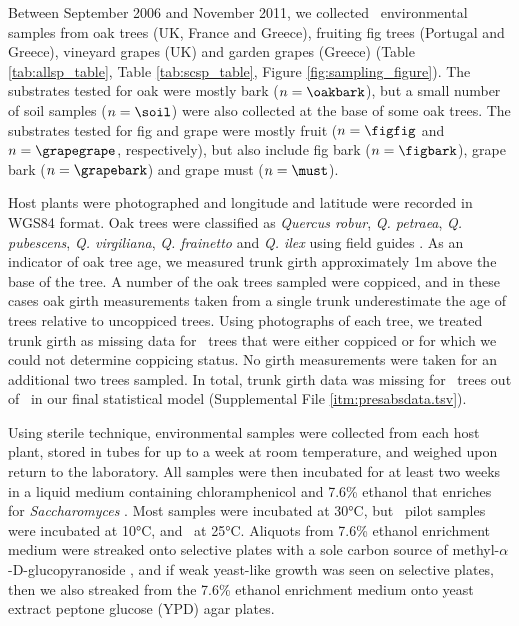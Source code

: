 \documentclass[12pt]{article}
\begin{document}
\begin{linenumbers}
Between September 2006 and November 2011, we collected \samplecount\ environmental samples from oak trees (UK, France and Greece), fruiting fig trees (Portugal and Greece), vineyard grapes (UK) and garden grapes (Greece) (Table \ref{tab:allsp_table}, Table \ref{tab:scsp_table}, Figure \ref{fig:sampling_figure}). The substrates tested for oak were mostly bark ($n=\oakbark$), but a small number of soil samples ($n=\soil$) were also collected at the base of some oak trees. The substrates tested for fig and grape were mostly fruit ($n=\figfig$ and $n=\grapegrape$, respectively), but also include fig bark ($n=\figbark$), grape bark ($n=\grapebark$) and grape must ($n=\must$). 

Host plants were photographed and longitude and latitude were recorded in WGS84 format. Oak trees were classified as \textit{Quercus robur}, \textit{Q. petraea}, \textit{Q. pubescens}, \textit{Q. virgiliana}, \textit{Q. frainetto} and \textit{Q. ilex} using field guides \citep{sutton_trees_1990, fitter_trees_2002}. As an indicator of oak tree age, we measured trunk girth approximately 1m above the base of the tree. A number of the oak trees sampled were coppiced, and in these cases oak girth measurements taken from a single trunk underestimate the age of trees relative to uncoppiced trees. Using photographs of each tree, we treated trunk girth as missing data for \coppiced\ trees that were either coppiced or for which we could not determine coppicing status. No girth measurements were taken for an additional two trees sampled. In total, trunk girth data was missing for \missingcircum\ trees out of \treecount\ in our final statistical model (Supplemental File \ref{itm:presabsdata.tsv}). 

Using sterile technique, environmental samples were collected from each host plant, stored in tubes for up to a week at room temperature, and weighed upon return to the laboratory. All samples were then incubated for at least two weeks in a liquid medium containing chloramphenicol and 7.6\% ethanol that enriches for \textit{Saccharomyces} \citep{sniegowski_saccharomyces_2002}. Most samples were incubated at 30\si{\degreeCelsius}, but \sampleten\ pilot samples were incubated at 10\si{\degreeCelsius}, and \sampletwentyfive\ at 25\si{\degreeCelsius}. Aliquots from 7.6\% ethanol enrichment medium were streaked onto selective plates with a sole carbon source of methyl-$\alpha$-D-glucopyranoside \citep{sniegowski_saccharomyces_2002}, and if weak yeast-like growth was seen on selective plates, then we also streaked from the 7.6\% ethanol enrichment medium onto yeast extract peptone glucose (YPD) agar plates. 


\end{linenumbers}
\end{document}
